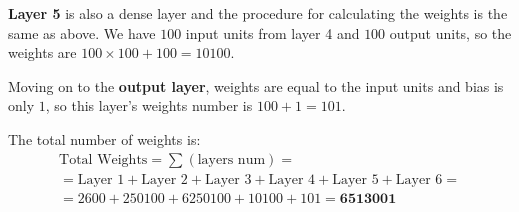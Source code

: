 \textbf{Layer 5} is also a dense layer and the procedure for calculating the weights is the same as above. We have $100$ input units from layer 4 and $100$ output units, so the weights are $100 \times 100  +100 = \num{10100}$.

Moving on to the \textbf{output layer}, weights are equal to the input units and bias is only $1$, so this layer's weights number is $100 +1 = 101$.

The total number of weights is:
\[
\begin{gathered}
\text{Total Weights} = \sum \left(\text{layers num}\right) = \\
= \text{Layer 1} + \text{Layer 2} + \text{Layer 3} + \text{Layer 4} + \text{Layer 5} + \text{Layer 6} = \\
= \num{2600} + \num{250100} + \num{6250100} + \num{10100} + \num{101} = \mathbf{\num{6513001}} 
\end{gathered}
\]